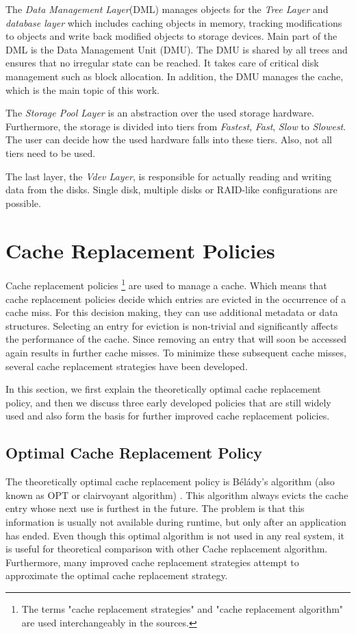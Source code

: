\documentclass[
	12pt,
	a4paper,
	abstract,
	bibliography=totoc,
	chapterprefix,
	headings=openright,
	numbers=endperiod,
	parskip=half,
	twoside,
]{scrreprt}
\begin{document}
The \emph{Data Management Layer}(DML) manages objects for the \emph{Tree Layer} and \emph{database layer} 
which includes caching objects in memory, tracking modifications to objects and write back modified 
objects to storage devices.
Main part of the DML is the Data Management Unit (DMU).
The DMU is shared by all trees and ensures that no irregular state can be reached.
It takes care of critical disk management such as block allocation.
In addition, the DMU manages the cache, which is the main topic of this work.

The \emph{Storage Pool Layer} is an abstraction over the used storage hardware.
Furthermore, the storage is divided into tiers from \emph{Fastest}, \emph{Fast}, \emph{Slow} to \emph{Slowest}.
The user can decide how the used hardware falls into these tiers. Also, not all tiers need to be used.

The last layer, the \emph{Vdev Layer}, is responsible for actually reading and writing data from the disks.
Single disk, multiple disks or RAID-like configurations are possible.

\section{Cache Replacement Policies}
\label{sec:cache replacement policies}

Cache replacement policies 
\footnote{The terms "cache replacement strategies" and "cache replacement algorithm" are used 
interchangeably in the sources.}
are used to manage a cache. 
Which means that cache replacement policies decide which entries are evicted in the occurrence of a cache miss.
For this decision making, they can use additional metadata or data structures.
Selecting an entry for eviction is non-trivial and significantly affects the performance of the cache.
Since removing an entry that will soon be accessed again results in further cache misses.
To minimize these subsequent cache misses, several cache replacement strategies have been developed.

In this section, we first explain the theoretically optimal cache replacement policy, 
and then we discuss three early developed policies that are still widely used and 
also form the basis for further improved cache replacement policies.

\subsection{Optimal Cache Replacement Policy}
The theoretically optimal cache replacement policy is Bélády's algorithm 
(also known as OPT or clairvoyant algorithm) \cite{belady1966study}.
This algorithm always evicts the cache entry whose next use is furthest in the future.
The problem is that this information is usually not available during runtime, but only after an application has ended.
Even though this optimal algorithm is not used in any real system, it is useful for theoretical comparison with other 
Cache replacement algorithm.
Furthermore, many improved cache replacement strategies attempt to approximate the optimal cache replacement strategy.
\end{document}
